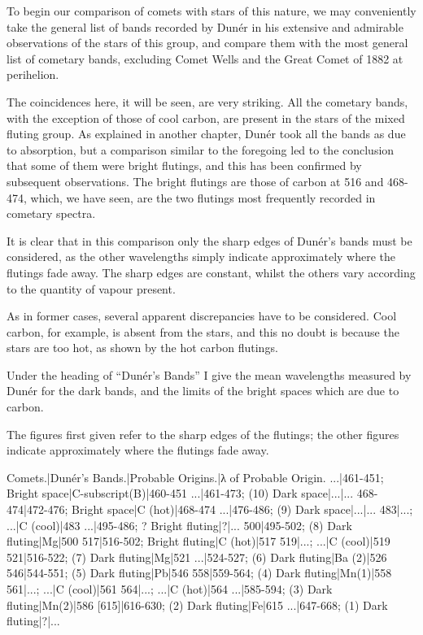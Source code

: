 \documentclass[a4paper, 12pt, oneside, polutonikogreek, english]{article}
\begin{document}
To begin our comparison of comets with stars of this nature, we may conveniently take the general list of bands recorded by Dunér in his extensive and admirable observations of the stars of this group, and compare them with the most general list of cometary bands, excluding Comet Wells and the Great Comet of 1882 at perihelion.

The coincidences here, it will be seen, are very striking. All the cometary bands, with the exception of those of cool carbon, are present in the stars of the mixed fluting group. As explained in another chapter, Dunér took all the bands as due to absorption, but a comparison similar to the foregoing led to the conclusion that some of them were bright flutings, and this has been confirmed by subsequent observations. The bright flutings are those of carbon at 516 and 468-474, which, we have seen, are the two flutings most frequently recorded in cometary spectra.

It is clear that in this comparison only the sharp edges of Dunér's bands must be considered, as the other wavelengths simply indicate approximately where the flutings fade away. The sharp edges are constant, whilst the others vary according to the quantity of vapour present.

As in former cases, several apparent discrepancies have to be considered. Cool carbon, for example, is absent from the stars, and this no doubt is because the stars are too hot, as shown by the hot carbon flutings.

Under the heading of ``Dunér's Bands'' I give the mean wavelengths measured by Dunér for the dark bands, and the limits of the bright spaces which are due to carbon.

The figures first given refer to the sharp edges of the flutings; the other figures indicate approximately where the flutings fade away.

Comets.|Dunér's Bands.|Probable Origins.|λ of Probable Origin. 
...|461-451; Bright space|C-subscript(B)|460-451 
...|461-473; (10) Dark space|...|... 
468-474|472-476; Bright space|C (hot)|468-474 
...|476-486; (9) Dark space|...|... 
483|...; ...|C (cool)|483 
...|495-486; ? Bright fluting|?|... 
500|495-502; (8) Dark fluting|Mg|500 
517|516-502; Bright fluting|C (hot)|517 
519|...; ...|C (cool)|519 
521|516-522; (7) Dark fluting|Mg|521 
...|524-527; (6) Dark fluting|Ba (2)|526 
546|544-551; (5) Dark fluting|Pb|546 
558|559-564; (4) Dark fluting|Mn(1)|558 
561|...; ...|C (cool)|561 
564|...; ...|C (hot)|564 
...|585-594; (3) Dark fluting|Mn(2)|586 
[615]|616-630; (2) Dark fluting|Fe|615 
...|647-668; (1) Dark fluting|?|... 
\end{document}
